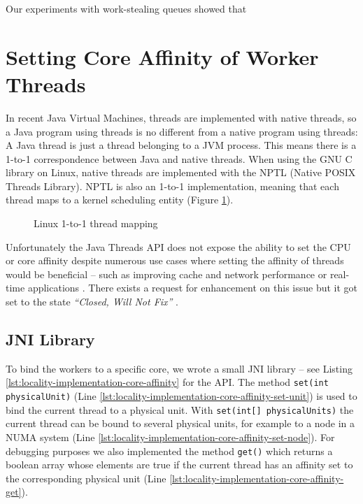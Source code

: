 Our experiments with work-stealing queues showed that 



\section{Setting Core Affinity of Worker Threads}
\label{sec:locality-implementation-core-affinity}

In recent Java Virtual Machines, threads are implemented with native
threads, so a Java program using threads is no different from a native
program using threads: A Java thread is just a thread belonging to a
JVM process. This means there is a 1-to-1 correspondence between Java
and native threads. When using the GNU C library on Linux, native
threads are implemented with the NPTL (Native POSIX Threads
Library). NPTL is also an 1-to-1 implementation, meaning that each
thread maps to a kernel scheduling entity (Figure
\ref{fig:locality-implementation-core-affinity-thread-mapping}).

\begin{figure}[htb]
  \centering
  \caption{Linux 1-to-1 thread mapping}
  \label{fig:locality-implementation-core-affinity-thread-mapping}
\end{figure}

Unfortunately the Java Threads API does not expose the ability to set
the CPU or core affinity despite numerous use cases where setting the
affinity of threads would be beneficial -- such as improving cache and
network performance or real-time applications \cite{Love2003, Dow2005,
  Foong2008}. There exists a request for enhancement on this issue but
it got set to the state \emph{``Closed, Will Not Fix''}
\cite{Oracle1999}.

\subsection{JNI Library}
\label{sec:locality-implementation-core-affinity-jni-library}

To bind the workers to a specific core, we wrote a small JNI library
-- see Listing \ref{lst:locality-implementation-core-affinity} for the
API. The method \lstinline!set(int physicalUnit)!  (Line
\ref{lst:locality-implementation-core-affinity-set-unit}) is used to
bind the current thread to a physical unit. With
\lstinline!set(int[] physicalUnits)! the current thread can be bound
to several physical units, for example to a node in a NUMA system
(Line \ref{lst:locality-implementation-core-affinity-set-node}). For
debugging purposes we also implemented the method \lstinline!get()!
which returns a boolean array whose elements are true if the current
thread has an affinity set to the corresponding physical unit (Line
\ref{lst:locality-implementation-core-affinity-get}).

